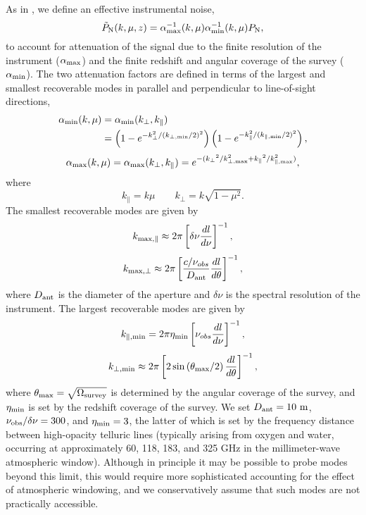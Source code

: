 \documentclass[twocolumn]{aastex631}
\newcommand{\be}{\begin{equation}}
\newcommand{\ee}{\end{equation}}
\begin{document}
As in \cite{MoradinezhadDizgah:2018lac}, we define an effective instrumental noise,
\be
\tilde P_{\rm N}(k,\mu,z) =  \alpha^{-1} _{\rm max}(k,\mu)\alpha^{-1} _{\rm min}(k,\mu)P_{\rm N},
\ee 
to account for attenuation of the signal due to the finite resolution of the instrument ($\alpha_{\rm max}$) and the finite redshift and angular coverage of the survey ($\alpha_{\rm min}$). The two attenuation factors are defined in terms of the largest and smallest recoverable modes in parallel and perpendicular to line-of-sight directions, 
\begin{align}\label{eqn:atten_kmin}
\alpha_{\rm min}(k,\mu) &= \alpha_{\rm min}(k_{\perp},k_{\parallel}) \\ 
&= \left (1-e^{-k_{\perp}^{2}/(k_{\perp,{\rm min}}/2)^{2}}\right) \left (1-e^{-k_{\parallel}^{2}/(k_{\parallel,{\rm min}}/2)^{2}} \right), \notag
\end{align}
\vspace{-.15in}
\begin{equation}\label{eqn:atten_kmax}
\alpha_{\rm max}(k,\mu) = \alpha_{\rm max}(k_{\perp},k_{\parallel}) = e^{-(k_{\perp}{^2}/k_{\perp,{\rm max}}^{2}+k_{\parallel}{^2}/k_{\parallel,{\rm max}}^{2})},
\end{equation}
where 
\be
k_\parallel = k\mu  \qquad k_\perp = k \sqrt{1-\mu^2}.
\ee
The smallest recoverable modes are given by
\begin{equation}\label{eqn:kmin_par}
k_{{\rm max},\parallel} \approx  2\pi \left [ \delta\nu  \frac{dl}{d\nu}\right ] ^{-1},
\end{equation}
\begin{equation}\label{eqn:kmin_perp}
k_{{\rm max},\perp} \approx 2\pi \left [ \frac{c/\nu_{obs}}{D_{\rm ant}} \frac{dl}{d\theta}\right ]^{-1},
\end{equation}
where $D_{\rm ant}$ is the diameter of the aperture and $\delta \nu$ is the spectral resolution of the instrument. The largest recoverable modes are given by
\begin{equation}\label{eq:kpar_min}
k_{\parallel,{\rm min}} = 2\pi \eta_{\rm min} \left [ \nu_{obs} \frac{dl}{d\nu} \right ] ^{-1},
\end{equation}
\begin{equation}\label{eq:kperp_min}
k_{\perp,{\rm min}}\approx2\pi \left[2\sin\left (\theta_{\rm max}/2\right )\frac{dl}{d\theta} \right ]^{-1},
\end{equation}
where $\theta_{\rm max} = \sqrt{\Omega_{\rm survey}}$ is determined by the angular coverage of the survey, and $\eta_{\rm min}$ is set by the redshift coverage of the survey. We set $D_{\rm ant} = 10 \ \rm m$, $\nu_{\rm obs}/\delta\nu = 300$, and $\eta_{\rm min} = 3$, the latter of which is set by the frequency distance between high-opacity telluric lines (typically arising from oxygen and water, occurring at approximately 60, 118, 183, and 325 GHz in the millimeter-wave atmospheric window). Although in principle it may be possible to probe modes beyond this limit, this would require more sophisticated accounting for the effect of atmospheric windowing, and we conservatively assume that such modes are not practically accessible.
\end{document}
